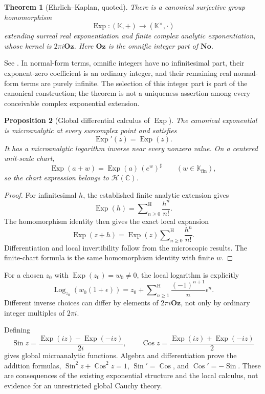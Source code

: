 \documentclass[11pt,oneside]{article}
\newtheorem{theorem}{Theorem}[section]
\newtheorem{proposition}[theorem]{Proposition}
\theoremstyle{definition}\newtheorem{definition}[theorem]{Definition}
\newcommand{\No}{\mathbf{No}}
\newcommand{\Oz}{\mathbf{Oz}}
\newcommand{\K}{\mathbb K}
\newcommand{\C}{\mathbb C}
\newcommand{\HH}{\mathcal H}
\newcommand{\Hsum}{\mathop{\sum}\nolimits^{\mathrm H}}
\newcommand{\Fin}{\K_{\mathrm{fin}}}
\begin{document}
\begin{theorem}[Ehrlich--Kaplan, quoted]\label{thm:EK}
There is a canonical surjective group homomorphism
\[
 \operatorname{Exp}:(\K,+)\longrightarrow(\K^\times,\cdot)
\]
extending surreal real exponentiation and finite complex analytic exponentiation, whose kernel is $2\pi i\Oz$. Here $\Oz$ is the omnific integer part of $\No$.
\end{theorem}
See \cite[Proposition 11.2 and Theorem 11.1]{EK}. In normal-form terms, omnific integers have no infinitesimal part, their exponent-zero coefficient is an ordinary integer, and their remaining real normal-form terms are purely infinite. The selection of this integer part is part of the canonical construction; the theorem is not a uniqueness assertion among every conceivable complex exponential extension.

\begin{proposition}[Global differential calculus of $\operatorname{Exp}$]\label{prop:expderivative}
The canonical exponential is microanalytic at every surcomplex point and satisfies
\[
 \operatorname{Exp}'(z)=\operatorname{Exp}(z).
\]
It has a microanalytic logarithm inverse near every nonzero value. On a centered unit-scale chart,
\[
 \operatorname{Exp}(a+w)=\operatorname{Exp}(a)\,(e^w)^\sharp
 \qquad(w\in\Fin),
\]
so the chart expression belongs to $\HH(\C)$.
\end{proposition}
\begin{proof}
For infinitesimal $h$, the established finite analytic extension gives
\[
 \operatorname{Exp}(h)=\Hsum_{n\geq0}\frac{h^n}{n!}.
\]
The homomorphism identity then gives the exact local expansion
\[
 \operatorname{Exp}(z+h)=\operatorname{Exp}(z)
      \Hsum_{n\geq0}\frac{h^n}{n!}.
\]
Differentiation and local invertibility follow from the microscopic results. The finite-chart formula is the same homomorphism identity with finite $w$.
\end{proof}
For a chosen $z_0$ with $\operatorname{Exp}(z_0)=w_0\ne0$, the local logarithm is explicitly
\[
 \operatorname{Log}_{z_0}(w_0(1+\epsilon))
 =z_0+\Hsum_{n\geq1}\frac{(-1)^{n+1}}n\epsilon^n.
\]
Different inverse choices can differ by elements of $2\pi i\Oz$, not only by ordinary integer multiples of $2\pi i$.

Defining
\[
 \operatorname{Sin}z=\frac{\operatorname{Exp}(iz)-\operatorname{Exp}(-iz)}{2i},
 \qquad
 \operatorname{Cos}z=\frac{\operatorname{Exp}(iz)+\operatorname{Exp}(-iz)}2
\]
gives global microanalytic functions. Algebra and differentiation prove the addition formulas,
$\operatorname{Sin}^2z+\operatorname{Cos}^2z=1$,
$\operatorname{Sin}'=\operatorname{Cos}$, and
$\operatorname{Cos}'=-\operatorname{Sin}$. These are consequences of the existing exponential structure and the local calculus, not evidence for an unrestricted global Cauchy theory.
\end{document}
